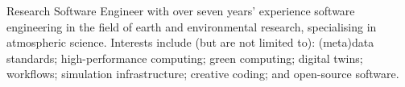 \par{
Research Software Engineer with over seven years' experience software engineering in the field of earth and environmental research, specialising in atmospheric science. Interests include (but are not limited to): (meta)data standards; high-performance computing; green computing; digital twins; workflows; simulation infrastructure; creative coding; and open-source software.
}